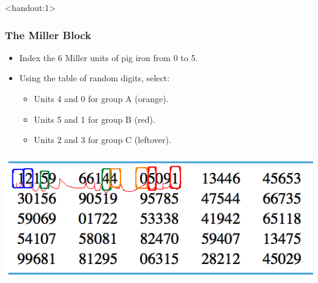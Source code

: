 \documentclass[handout]{beamer}
\newcommand{\answers}{1}
\numberwithin{equation}{section}
\begin{document}
\begin{frame}<handout:\answers>
\frametitle{The Miller Block}

\begin{itemize}
 \item Index the 6 Miller units of pig iron from 0 to 5.
\pause \item Using the table of random digits, select:
\begin{itemize}
\pause \item Units 4 and 0 for group A (orange).
\pause \item Units 5 and 1 for group B (red).
\pause \item Units 2 and 3 for group C (leftover).
\end{itemize}
\end{itemize}
\begin{center}
 \includegraphics{../../fig/rdigitsshortMiller.png}
\end{center}
\end{frame}


\end{document}

